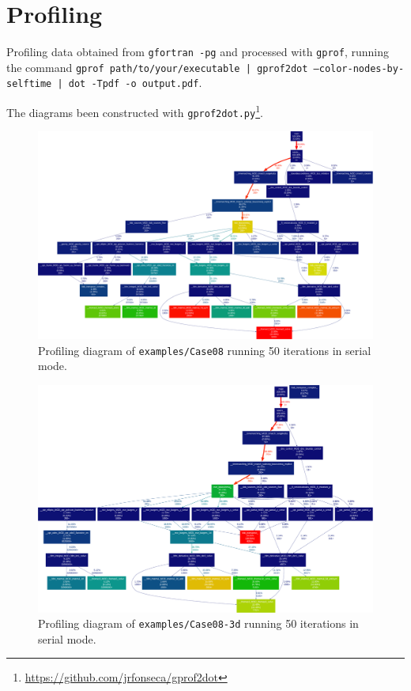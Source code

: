 \chapter{Profiling}\label{sec:profiling}

Profiling data obtained from \texttt{gfortran -pg} and processed with \texttt{gprof}, running the command \texttt{gprof path/to/your/executable | gprof2dot --color-nodes-by-selftime | dot -Tpdf -o output.pdf}.

The diagrams been constructed with \texttt{gprof2dot.py}\footnote{\url{https://github.com/jrfonseca/gprof2dot}}.

\begin{figure}[!h]
  \centering
  \includegraphics[clip,width=\textwidth]{fig-profiling08.pdf}
  \caption{Profiling diagram of \texttt{examples/Case08} running 50 iterations in serial mode.}
\end{figure}

\newpage

\begin{figure}[!h]
  \centering
  \includegraphics[clip,width=\textwidth]{fig-profiling08-3d.pdf}
  \caption{Profiling diagram of \texttt{examples/Case08-3d} running 50 iterations in serial mode.}
\end{figure}

